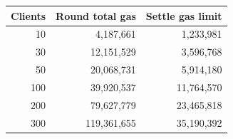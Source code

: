 \begin{tabular}{rrr}
\toprule
Clients & Round total gas & Settle gas limit \\
\midrule
10 & 4,187,661 & 1,233,981 \\
30 & 12,151,529 & 3,596,768 \\
50 & 20,068,731 & 5,914,180 \\
100 & 39,920,537 & 11,764,570 \\
200 & 79,627,779 & 23,465,818 \\
300 & 119,361,655 & 35,190,392 \\
\bottomrule
\end{tabular}
